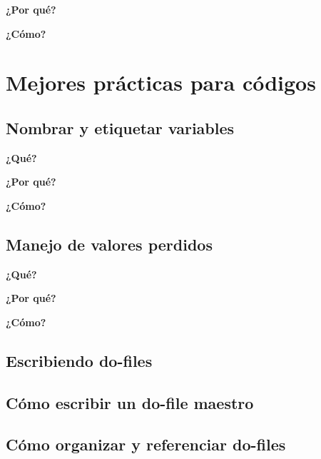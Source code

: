 \documentclass[11pt,en]{elegantpaper}
\begin{document}
\textbf{¿Por qué?} 


\textbf{¿Cómo? }
\section{Mejores prácticas para códigos}

\subsection{Nombrar y etiquetar variables}
\textbf{¿Qué?}


\textbf{¿Por qué?} 


\textbf{¿Cómo?} 
\subsection{Manejo de valores perdidos}
\textbf{¿Qué?}


\textbf{¿Por qué? }


\textbf{¿Cómo? }
\subsection{Escribiendo do-files}

\subsection{Cómo escribir un do-file maestro}

\subsection{Cómo organizar y referenciar do-files}
\end{document}
